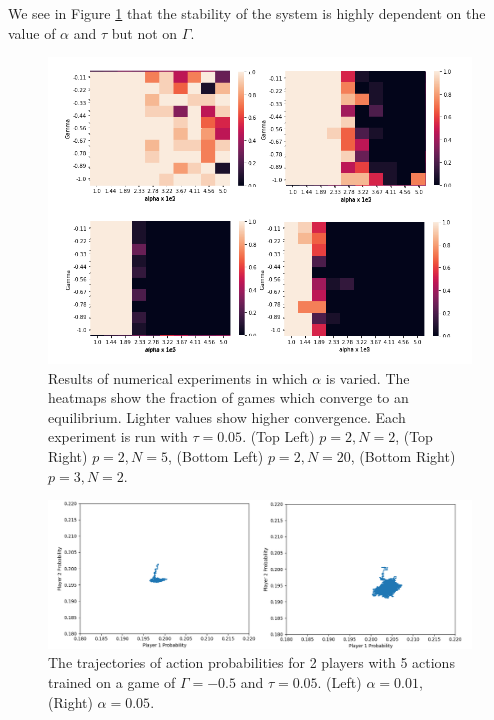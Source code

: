 \documentclass[sigconf,anonymous]{aamas}
\begin{document}
We see in Figure \ref{fig:NumericalExperiments} that the stability of the system is highly dependent on
the value of $\alpha$ and $\tau$ but not on $\Gamma$.
   
\begin{figure}[t]
    \includegraphics[width = 1.2 \linewidth, center]{Figures/Experiments.png}
    \caption{Results of numerical experiments in which $\alpha$ is varied. The heatmaps show the fraction of games which converge to an equilibrium. Lighter values show higher convergence. Each experiment is run with $\tau = 0.05$. (Top Left) $p = 2, N = 2$, (Top Right) $p = 2, N = 5$, (Bottom Left) $p = 2, N = 20$, (Bottom Right) $p=3, N = 2$.}
    \label{fig:NumericalExperiments}
\end{figure}

\begin{figure}[t]
    \includegraphics[width = 1.1 \linewidth, center]{Figures/a5e2var.png}
    \caption{The trajectories of action probabilities for 2 players with 5 actions trained on a game of $\Gamma = -0.5$ and $\tau = 0.05$. (Left) $\alpha = 0.01$, (Right) $\alpha = 0.05$.}
    \label{fig:AlphaVariation}
\end{figure}
\end{document}

